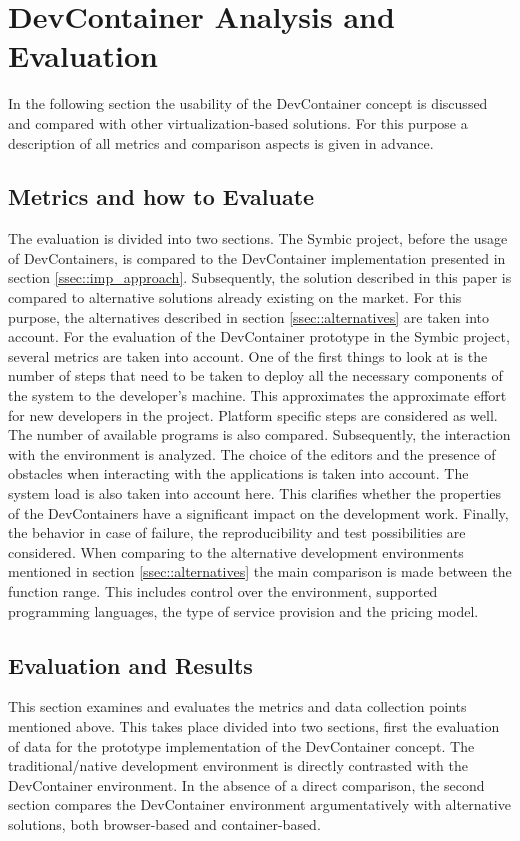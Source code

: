 
\section{DevContainer Analysis and Evaluation}\label{sec::eval}
In the following section the usability of the DevContainer concept is discussed and compared with other virtualization-based solutions. For this purpose a description of all metrics and comparison aspects is given in advance.

\subsection{Metrics and how to Evaluate}
The evaluation is divided into two sections. The Symbic project, before the usage of DevContainers, is compared to the DevContainer implementation presented in section \ref{ssec::imp_approach}. Subsequently, the solution described in this paper is compared to alternative solutions already existing on the market. For this purpose, the alternatives described in section \ref{ssec::alternatives} are taken into account.\newline
For the evaluation of the DevContainer prototype in the Symbic project, several metrics are taken into account. One of the first things to look at is the number of steps that need to be taken to deploy all the necessary components of the system to the developer's machine. This approximates the approximate effort for new developers in the project. Platform specific steps are considered as well. The number of available programs is also compared. Subsequently, the interaction with the environment is analyzed. The choice of the editors and the presence of obstacles when interacting with the applications is taken into account. The system load is also taken into account here. This clarifies whether the properties of the DevContainers have a significant impact on the development work. Finally, the behavior in case of failure, the reproducibility and test possibilities are considered. \newline
When comparing to the alternative development environments mentioned in section \ref{ssec::alternatives} the main comparison is made between the function range. This includes control over the environment, supported programming languages, the type of service provision and the pricing model.

\subsection{Evaluation and Results}\label{sses::eval_compare}
This section examines and evaluates the metrics and data collection points mentioned above. This takes place divided into two sections, first the evaluation of data for the prototype implementation of the DevContainer concept. The traditional/native development environment is directly contrasted with the DevContainer environment.
In the absence of a direct comparison, the second section compares the DevContainer environment argumentatively with alternative solutions, both browser-based and container-based.

